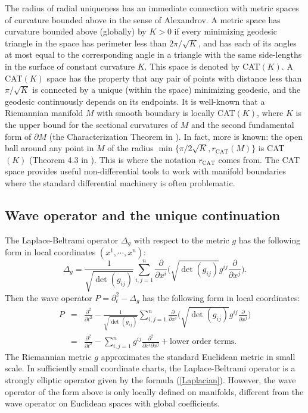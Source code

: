 \documentclass[11pt,letterpaper]{amsart}
\numberwithin{equation}{section}
\theoremstyle{definition}
\theoremstyle{plain}
\theoremstyle{definition}
\theoremstyle{plain}
\theoremstyle{definition}
\theoremstyle{plain}
\begin{document}
The radius of radial uniqueness has an immediate connection with metric spaces of curvature bounded above in the sense of Alexandrov. A metric space has curvature bounded above (globally) by $K>0$ if every minimizing geodesic triangle in the space has perimeter less than $2\pi/\sqrt{K}$, and has each of its angles at most equal to the corresponding angle in a triangle with the same side-lengths in the surface of constant curvature $K$. This space is denoted by CAT$(K)$. A CAT$(K)$ space has the property that any pair of points with distance less than $\pi/\sqrt{K}$ is connected by a unique (within the space) minimizing geodesic, and the geodesic continuously depends on its endpoints. It is well-known that a Riemannian manifold $M$ with smooth boundary is locally CAT$(K)$, where $K$ is the upper bound for the sectional curvatures of $M$ and the second fundamental form of $\partial M$ (the Characterization Theorem in \cite{ABB2}). In fact, more is known: the open ball around any point in $M$ of the radius $\min\{\pi/2\sqrt{K},r_{\textrm{CAT}}(M)\}$ is CAT$(K)$ (Theorem 4.3 in \cite{AB}). This is where the notation $r_{\textrm{CAT}}$ comes from. The CAT space provides useful non-differential tools to work with manifold boundaries where the standard differential machinery is often problematic. 

\subsection{Wave operator and the unique continuation}

The Laplace-Beltrami operator $\Delta_g$ with respect to the metric $g$ has the following form in local coordinates $(x^1,\cdots,x^n)$:
\begin{equation}\label{Laplacian}
\Delta_g=\frac{1}{\sqrt{\det(g_{ij})}} \sum_{i,j=1}^n \frac{\partial}{\partial x^i} \Big(\sqrt{\det(g_{ij})} g^{ij}\frac{\partial}{\partial x^j}\Big).
\end{equation}
Then the wave operator $P=\partial_t^2-\Delta_g$ has the following form in local coordinates:
\begin{eqnarray}\label{Pdef}
P&=& \frac{\partial^2}{\partial t^2}-\frac{1}{\sqrt{\det(g_{ij})}} \sum_{i,j=1}^n \frac{\partial}{\partial x^i} \Big(\sqrt{\det(g_{ij})} g^{ij}\frac{\partial}{\partial x^j}\Big) \\ 
&=&\frac{\partial^2}{\partial t^2}-\sum_{i,j=1}^n g^{ij}\frac{\partial^2}{\partial x^i \partial x^j} + \textrm{lower order terms}. \nonumber
\end{eqnarray}
The Riemannian metric $g$ approximates the standard Euclidean metric in small scale. In sufficiently small coordinate charts, the Laplace-Beltrami operator is a strongly elliptic operator given by the formula (\ref{Laplacian}). However, the wave operator of the form above is only locally defined on manifolds, different from the wave operator on Euclidean spaces with global coefficients. 
\end{document}
